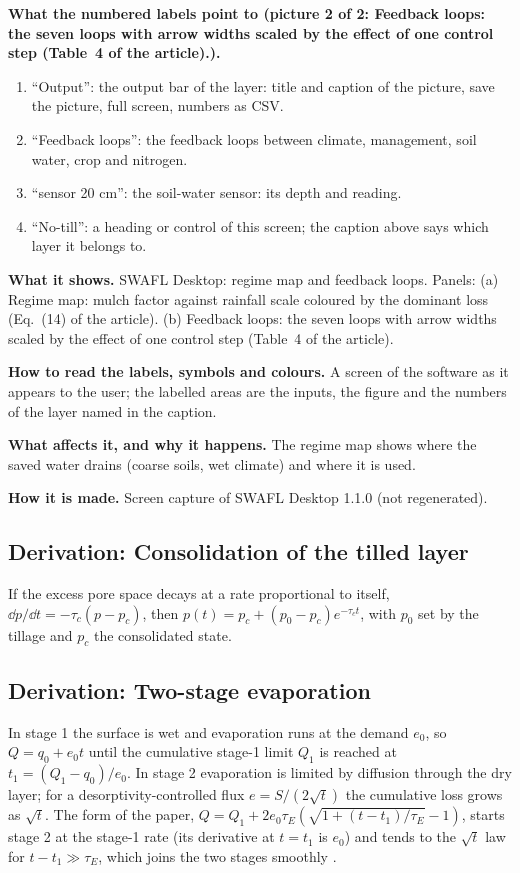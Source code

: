 \textbf{What the numbered labels point to (picture 2 of 2: Feedback loops: the seven loops with arrow widths scaled by the effect of one control step (Table~4 of the article).).}
\begin{enumerate}[nosep,label=\protect\circled{\arabic*}]
\item ``Output'': the output bar of the layer: title and caption of the picture, save the picture, full screen, numbers as CSV.
\item ``Feedback loops'': the feedback loops between climate, management, soil water, crop and nitrogen.
\item ``sensor 20 cm'': the soil-water sensor: its depth and reading.
\item ``No-till'': a heading or control of this screen; the caption above says which layer it belongs to.
\end{enumerate}

\textbf{What it shows.} SWAFL Desktop: regime map and feedback loops. Panels: (a) Regime map: mulch factor against rainfall scale coloured by the dominant loss (Eq.~(14) of the article). (b) Feedback loops: the seven loops with arrow widths scaled by the effect of one control step (Table~4 of the article).

\textbf{How to read the labels, symbols and colours.} A screen of the software as it appears to the user; the labelled areas are the inputs, the figure and the numbers of the layer named in the caption.

\textbf{What affects it, and why it happens.} The regime map shows where the saved water drains (coarse soils, wet climate) and where it is used. 

\textbf{How it is made.} Screen capture of SWAFL Desktop 1.1.0 (not regenerated).


\subsection{Derivation: Consolidation of the tilled layer}\label{der:s2:4}
If the excess pore space decays at a rate proportional to itself, $\dd p/\dd t=-\tau_c(p-p_c)$, then $p(t)=p_c+(p_0-p_c)e^{-\tau_ct}$, with $p_0$ set by the tillage and $p_c$ the consolidated state.


\subsection{Derivation: Two-stage evaporation}\label{der:s2:5}
In stage 1 the surface is wet and evaporation runs at the demand $e_0$, so $Q=q_0+e_0t$ until the cumulative stage-1 limit $Q_1$ is reached at $t_1=(Q_1-q_0)/e_0$. In stage 2 evaporation is limited by diffusion through the dry layer; for a desorptivity-controlled flux $e=S/(2\sqrt{t})$ the cumulative loss grows as $\sqrt t$. The form of the paper, $Q=Q_1+2e_0\tau_E(\sqrt{1+(t-t_1)/\tau_E}-1)$, starts stage 2 at the stage-1 rate (its derivative at $t=t_1$ is $e_0$) and tends to the $\sqrt t$ law for $t-t_1\gg\tau_E$, which joins the two stages smoothly \citep{Ritchie1972,Philip1957}.


